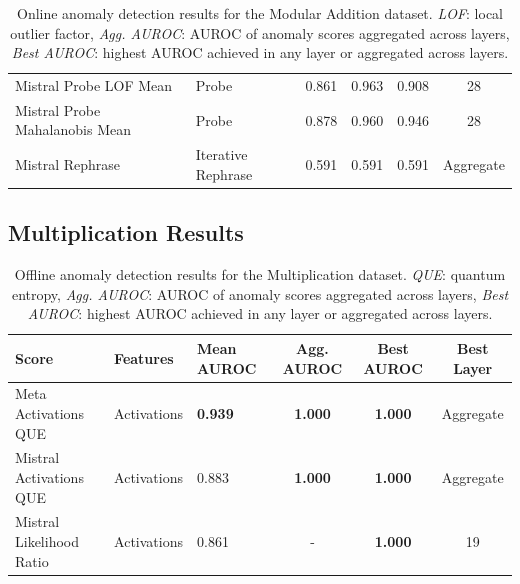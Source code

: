 \begin{table}[H]
\begin{tabular}{lp{3cm}lccc}
Mistral Probe LOF Mean               & Probe                  & 0.861  & 0.963  & 0.908  & 28 \\ 
Mistral Probe Mahalanobis Mean       & Probe                  & 0.878  & 0.960  & 0.946  & 28 \\ 
Mistral Rephrase                     & Iterative Rephrase     & 0.591  & 0.591  & 0.591  & Aggregate \\ 
\bottomrule
\end{tabular}
\caption{ Online anomaly detection results for the Modular Addition dataset. \emph{LOF}: local outlier factor, \emph{Agg. AUROC}: AUROC of anomaly scores aggregated across layers, \emph{Best AUROC}: highest AUROC achieved in any layer or aggregated across layers.}
\label{tab:online_anomaly_modular_addition}
\end{table}

\subsection{Multiplication Results}

\begin{table}[H]
\centering
\scriptsize  %
\renewcommand{\arraystretch}{1.2}  %
\setlength{\tabcolsep}{2pt}  %
\begin{tabular}{lp{3cm}lccc}
\toprule
\textbf{Score} & \textbf{Features} & \textbf{Mean AUROC} & \textbf{Agg. AUROC} & \textbf{Best AUROC} & \textbf{Best Layer} \\
\midrule
Meta Activations QUE     & Activations & \textbf{0.939}  & \textbf{1.000}  & \textbf{1.000}  & Aggregate \\ 
Mistral Activations QUE  & Activations & 0.883  & \textbf{1.000}  & \textbf{1.000}  & Aggregate \\ 
Mistral Likelihood Ratio & Activations & 0.861  & -      & \textbf{1.000}  & 19 \\ 
\bottomrule
\end{tabular}
\caption{ Offline anomaly detection results for the Multiplication dataset. \emph{QUE}: quantum entropy, \emph{Agg. AUROC}: AUROC of anomaly scores aggregated across layers, \emph{Best AUROC}: highest AUROC achieved in any layer or aggregated across layers.}
\label{tab:offline_anomaly_multiplication}
\end{table}

